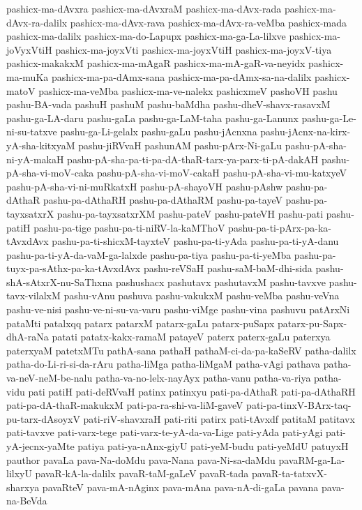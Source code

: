 {pashicx-ma-dAvxra
pashicx-ma-dAvxraM
pashicx-ma-dAvx-rada
pashicx-ma-dAvx-ra-dalilx
pashicx-ma-dAvx-rava
pashicx-ma-dAvx-ra-veMba
pashicx-mada
pashicx-ma-dalilx
pashicx-ma-do-Lapupx
pashicx-ma-ga-La-lilxve
pashicx-ma-joVyxVtiH
pashicx-ma-joyxVti
pashicx-ma-joyxVtiH
pashicx-ma-joyxV-tiya
pashicx-makakxM
pashicx-ma-mAgaR
pashicx-ma-mA-gaR-va-neyidx
pashicx-ma-muKa
pashicx-ma-pa-dAmx-sana
pashicx-ma-pa-dAmx-sa-na-dalilx
pashicx-matoV
pashicx-ma-veMba
pashicx-ma-ve-nalekx
pashicxmeV
pashoVH
pashu
pashu-BA-vada
pashuH
pashuM
pashu-baMdha
pashu-dheV-shavx-rasavxM
pashu-ga-LA-daru
pashu-gaLa
pashu-ga-LaM-taha
pashu-ga-Lanunx
pashu-ga-Le-ni-su-tatxve
pashu-ga-Li-gelalx
pashu-gaLu
pashu-jAcnxna
pashu-jAcnx-na-kirx-yA-sha-kitxyaM
pashu-jiRVvaH
pashunAM
pashu-pArx-Ni-gaLu
pashu-pA-sha-ni-yA-makaH
pashu-pA-sha-pa-ti-pa-dA-thaR-tarx-ya-parx-ti-pA-dakAH
pashu-pA-sha-vi-moV-caka
pashu-pA-sha-vi-moV-cakaH
pashu-pA-sha-vi-mu-katxyeV
pashu-pA-sha-vi-ni-muRkatxH
pashu-pA-shayoVH
pashu-pAshw
pashu-pa-dAthaR
pashu-pa-dAthaRH
pashu-pa-dAthaRM
pashu-pa-tayeV
pashu-pa-tayxsatxrX
pashu-pa-tayxsatxrXM
pashu-pateV
pashu-pateVH
pashu-pati
pashu-patiH
pashu-pa-tige
pashu-pa-ti-niRV-la-kaMThoV
pashu-pa-ti-pArx-pa-ka-tAvxdAvx
pashu-pa-ti-shicxM-tayxteV
pashu-pa-ti-yAda
pashu-pa-ti-yA-danu
pashu-pa-ti-yA-da-vaM-ga-lalxde
pashu-pa-tiya
pashu-pa-ti-yeMba
pashu-pa-tuyx-pa-sAthx-pa-ka-tAvxdAvx
pashu-reVSaH
pashu-saM-baM-dhi-sida
pashu-shA-sAtxrX-nu-SaThxna
pashushacx
pashutavx
pashutavxM
pashu-tavxve
pashu-tavx-vilalxM
pashu-vAnu
pashuva
pashu-vakukxM
pashu-veMba
pashu-veVna
pashu-ve-nisi
pashu-ve-ni-su-va-varu
pashu-viMge
pashu-vina
pashuvu
patArxNi
pataMti
patalxqq
patarx
patarxM
patarx-gaLu
patarx-puSapx
patarx-pu-Sapx-dhA-raNa
patati
patatx-kakx-ramaM
patayeV
paterx
paterx-gaLu
paterxya
paterxyaM
patetxMTu
pathA-sana
pathaH
pathaM-ci-da-pa-kaSeRV
patha-dalilx
patha-do-Li-ri-si-da-rAru
patha-liMga
patha-liMgaM
patha-vAgi
pathava
patha-va-neV-neM-be-nalu
patha-va-no-lelx-nayAyx
patha-vanu
patha-va-riya
patha-vidu
pati
patiH
pati-deRVvaH
patinx
patinxyu
pati-pa-dAthaR
pati-pa-dAthaRH
pati-pa-dA-thaR-makukxM
pati-pa-ra-shi-va-liM-gaveV
pati-pa-tinxV-BArx-taq-pu-tarx-dAsoyxV
pati-riV-shavxraH
pati-riti
patirx
pati-tAvxdf
patitaM
patitavx
pati-tavxve
pati-varx-tege
pati-varx-te-yA-da-va-Lige
pati-yAda
pati-yAgi
pati-yA-jecnx-yaMte
patiya
pati-ya-nAnx-giyU
pati-yeM-budu
pati-yeMdU
patuyxH
pauthor
pavaLa
pava-Na-doMdu
pava-Nana
pava-Ni-sa-daMdu
pavaRM-ga-La-lilxyU
pavaR-kA-la-dalilx
pavaR-taM-gaLeV
pavaR-tada
pavaR-ta-tatxvX-sharxya
pavaRteV
pava-mA-nAginx
pava-mAna
pava-nA-di-gaLa
pavana
pava-na-BeVda
}
